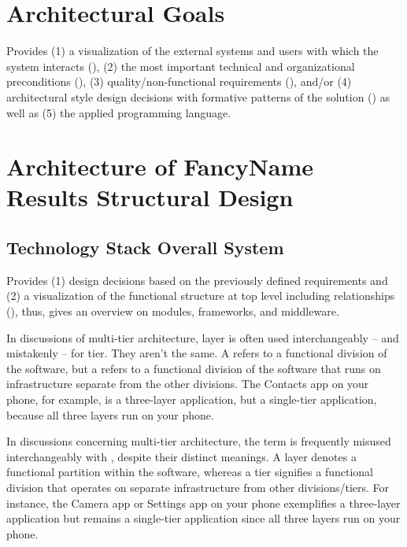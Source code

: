 \documentclass[conference,a4paper,flushend]{neutr}
\begin{document}
\section{Architectural Goals} %
Provides
(1) a visualization of the external systems and users with which the system interacts (),
(2) the most important technical and organizational preconditions (),
(3) quality/non-functional requirements (), and/or
(4) architectural style design decisions with formative patterns of the solution ()
as well as (5) the applied programming language.

\section{Architecture of FancyName \textbar{} Results \textbar{} Structural Design \textbar{}  }

\subsection{Technology Stack \textbar{} Overall System} %
Provides
(1) design decisions based on the previously defined requirements and
(2) a visualization of the functional structure at top level including relationships (), thus, gives an overview on modules, frameworks, and middleware.

In discussions of multi-tier architecture, layer is often used interchangeably -- and mistakenly -- for tier. They aren't the same. A  refers to a functional division of the software, but a  refers to a functional division of the software that runs on infrastructure separate from the other divisions. The Contacts app on your phone, for example, is a three-layer application, but a single-tier application, because all three layers run on your phone.

In discussions concerning multi-tier architecture, the term  is frequently misused interchangeably with , despite their distinct meanings. A layer denotes a functional partition within the software, whereas a tier signifies a functional division that operates on separate infrastructure from other divisions/tiers. For instance, the Camera app or Settings app on your phone exemplifies a three-layer application but remains a single-tier application since all three layers run on your phone.
\end{document}
